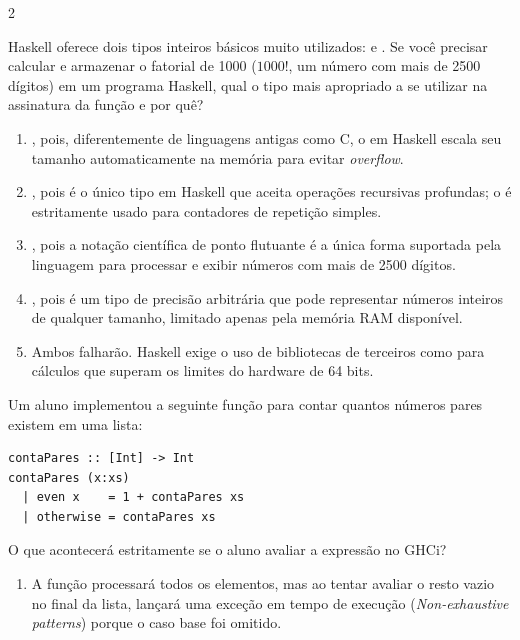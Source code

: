 \documentclass[a4paper,10pt,brazil]{article}
\begin{document}
\begin{multicols}{2}
\begin{enumerate}
\end{enumerate}

Haskell oferece dois tipos inteiros básicos muito utilizados:  e . Se você precisar calcular e armazenar o fatorial de 1000 ($1000!$, um número com mais de 2500 dígitos) em um programa Haskell, qual o tipo mais apropriado a se utilizar na assinatura da função e por quê?

\begin{enumerate}
  \item {}, pois, diferentemente de linguagens antigas como C, o  em Haskell escala seu tamanho automaticamente na memória para evitar \emph{overflow}.

  \item {}, pois é o único tipo em Haskell que aceita operações recursivas profundas; o  é estritamente usado para contadores de repetição simples.

  \item {}, pois a notação científica de ponto flutuante é a única forma suportada pela linguagem para processar e exibir números com mais de 2500 dígitos.

  \item {}, pois é um tipo de precisão arbitrária que pode representar números inteiros de qualquer tamanho, limitado apenas pela memória RAM disponível.

  \item Ambos falharão. Haskell exige o uso de bibliotecas de terceiros como  para cálculos que superam os limites do hardware de 64 bits.


\end{enumerate}

Um aluno implementou a seguinte função para contar quantos números pares existem em uma lista:

\begin{verbatim}
contaPares :: [Int] -> Int
contaPares (x:xs)
  | even x    = 1 + contaPares xs
  | otherwise = contaPares xs
\end{verbatim}

O que acontecerá estritamente se o aluno avaliar a expressão  no GHCi?

\begin{enumerate}
  \item A função processará todos os elementos, mas ao tentar avaliar o resto vazio no final da lista, lançará uma exceção em tempo de execução (\emph{Non-exhaustive patterns}) porque o caso base  foi omitido.


\end{enumerate}
\end{multicols}
\end{document}
